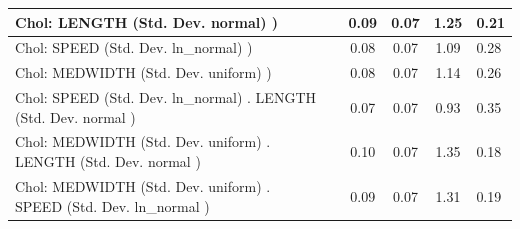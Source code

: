 \begin{table}
\begin{center}
\begin{tabular}{|l|l|c|c|c|l|}
			\hline
			 Chol: LENGTH (Std. Dev. normal) ) &  & 0.09 & 0.07 & 1.25 & 0.21 \\
			\hline
			 Chol: SPEED (Std. Dev. ln_normal) ) &  & 0.08 & 0.07 & 1.09 & 0.28 \\
			\hline
			 Chol: MEDWIDTH (Std. Dev. uniform) ) &  & 0.08 & 0.07 & 1.14 & 0.26 \\
			\hline
			 Chol: SPEED (Std. Dev. ln_normal) . LENGTH (Std. Dev.   normal ) &  & 0.07 & 0.07 & 0.93 & 0.35 \\
			\hline
			 Chol: MEDWIDTH (Std. Dev. uniform) . LENGTH (Std. Dev.   normal ) &  & 0.10 & 0.07 & 1.35 & 0.18 \\
			\hline
			 Chol: MEDWIDTH (Std. Dev. uniform) . SPEED (Std. Dev.   ln_normal ) &  & 0.09 & 0.07 & 1.31 & 0.19 \\
			\hline
		\end{tabular}
	\end{center}
\end{table}